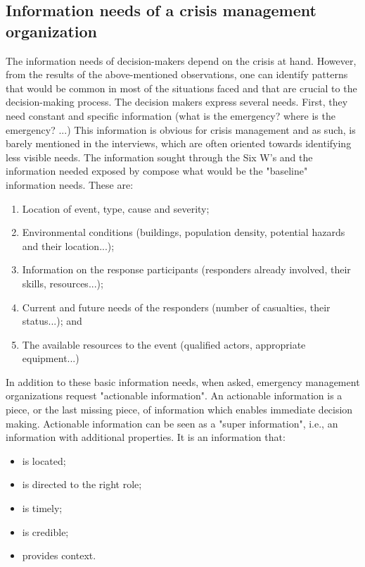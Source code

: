 \subsection{Information needs of a crisis management organization}
The information needs of decision-makers depend on the crisis at hand.
However, from the results of the above-mentioned observations, one can identify patterns
that would be common in most of the situations faced and that are crucial to the decision-making process.
The decision makers express several needs.
First, they need constant and specific information (what is the emergency? where is the emergency? ...)
This information is obvious for crisis management and as such, is barely mentioned in the
interviews, which are often oriented towards identifying less visible needs.
The information sought through the Six W's and the information needed exposed by \textcite{jacksonInformationSharingEmergency2006}
compose what would be the "baseline" information needs.
These are:

\begin{enumerate}
    \item Location of event, type, cause and severity;
    \item Environmental conditions (buildings, population density, potential hazards and their location...);
    \item Information on the response participants (responders already involved, their skills, resources...);
    \item Current and future needs of the responders (number of casualties, their status...); and
    \item The available resources to the event (qualified actors, appropriate equipment...)
\end{enumerate}

In addition to these basic information needs, when asked, emergency management organizations
request "actionable information".
An actionable information is a piece, or the last missing piece, of information which enables
immediate decision making.
Actionable information can be seen as a "super information", i.e., an information with additional properties.
It is an information that:

\begin{itemize}
    \item is located;
    \item is directed to the right role;
    \item is timely;
    \item is credible;
    \item provides context.
\end{itemize}

